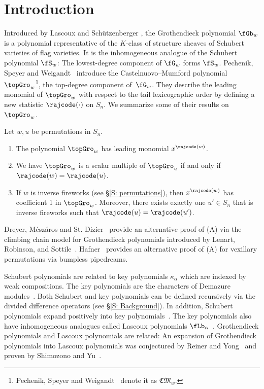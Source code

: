 
\section{Introduction}\label{S: Intro}

Introduced by Lascoux and Sch\"utzenberger \cite{LS:Groth},
the Grothendieck polynomial $\fGb_w$
is a polynomial representative of the 
$K$-class of structure sheaves of 
Schubert varieties of flag varieties.
It is the inhomogeneous analogue
of the Schubert polynomial $\fS_w$: 
The lowest-degree component
of $\fG_w$ forms $\fS_w$.
Pechenik, Speyer and Weigandt~\cite{PSW} introduce the
Castelnuovo--Mumford polynomial $\topGro_w$\footnote{Pechenik, Speyer and Weigandt~\cite{PSW} denote it as $\mathfrak{CM}_w$.}, 
the top-degree component of~$\fG_w$.
They describe the leading monomial of $\topGro_w$
with respect to the tail lexicographic order
by defining a new statistic 
$\rajcode(\cdot)$ on $S_n$.
We summarize some of their results on $\topGro_w$.

\begin{ourthm}
\label{thm:psw}
Let $w,u$ be permutations in $S_n$.
\begin{enumerate}
\item[(A)]
The polynomial $\topGro_w$ has leading monomial $x^{\rajcode(w)}$.
\item[(B)] 
We have
$\topGro_w$ is a scalar multiple of $\topGro_{u}$
if and only if $\rajcode(w) = \rajcode(u)$.
\item[(C)] 
If $w$ is inverse fireworks 
(see \S\ref{S: permutations}), 
then $x^{\rajcode(w)}$ has 
coefficient 1 in $\topGro_w$.
Moreover, there exists
exactly one $u'\in S_n$ that is inverse fireworks
such that $\rajcode(u) = \rajcode(u')$.
\end{enumerate}
\end{ourthm}

Dreyer, M\'esz\'aros and St. Dizier~\cite{dms22}
provide an alternative proof of (A) via the 
climbing chain model for Grothendieck polynomials
introduced by Lenart, Robinson, and Sottile~\cite{LRS}.
Hafner~\cite{Haf} provides an alternative proof of (A)
for vexillary permutations via bumpless pipedreams.

Schubert polynomials are related
to key polynomials $\kappa_\alpha$
which are indexed by weak compositions.
The key polynomials are the characters of 
Demazure modules~\cite{De}.
Both Schubert and key polynomials 
can be defined recursively 
via the divided difference operators 
(see \S\ref{S: Background}).
In addition, Schubert polynomials
expand positively into key polynomials~\cite{RS}.
The key polynomials also have
inhomogeneous analogues called Lascoux polynomials $\fLb_\alpha$~\cite{Las}.
Grothendieck polynomials and Lascoux polynomials are related: 
An expansion of Grothendieck polynomials into Lascoux polynomials 
was conjectured by Reiner and Yong~\cite{RY} and 
proven by Shimozono and Yu~\cite{SY}.

